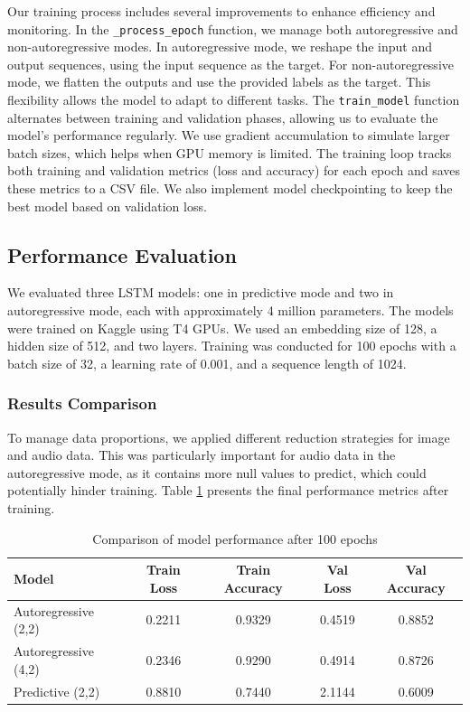 \documentclass[10pt,a4paper]{article}
\begin{document}
Our training process includes several improvements to enhance efficiency and monitoring. In the \texttt{\_process\_epoch} function, we manage both autoregressive and non-autoregressive modes. In autoregressive mode, we reshape the input and output sequences, using the input sequence as the target. For non-autoregressive mode, we flatten the outputs and use the provided labels as the target. This flexibility allows the model to adapt to different tasks. The \texttt{train\_model} function alternates between training and validation phases, allowing us to evaluate the model's performance regularly. We use gradient accumulation to simulate larger batch sizes, which helps when GPU memory is limited. The training loop tracks both training and validation metrics (loss and accuracy) for each epoch and saves these metrics to a CSV file. We also implement model checkpointing to keep the best model based on validation loss.

\subsection{Performance Evaluation}

We evaluated three LSTM models: one in predictive mode and two in autoregressive mode, each with approximately 4 million parameters. The models were trained on Kaggle using T4 GPUs. We used an embedding size of 128, a hidden size of 512, and two layers. Training was conducted for 100 epochs with a batch size of 32, a learning rate of 0.001, and a sequence length of 1024.

\subsubsection{Results Comparison}

To manage data proportions, we applied different reduction strategies for image and audio data. This was particularly important for audio data in the autoregressive mode, as it contains more null values to predict, which could potentially hinder training. Table \ref{tab:model_comparison_lstm} presents the final performance metrics after training.

\begin{table}[ht]
\centering
\caption{Comparison of model performance after 100 epochs}
\label{tab:model_comparison_lstm}
\begin{tabular}{|l|c|c|c|c|}
\hline
\textbf{Model} & \textbf{Train Loss} & \textbf{Train Accuracy} & \textbf{Val Loss} & \textbf{Val Accuracy} \\
\hline
Autoregressive (2,2) & 0.2211 & 0.9329 & 0.4519 & 0.8852 \\
Autoregressive (4,2) & 0.2346 & 0.9290 & 0.4914 & 0.8726 \\
Predictive (2,2) & 0.8810 & 0.7440 & 2.1144 & 0.6009 \\
\hline
\end{tabular}
\end{table}
\end{document}
